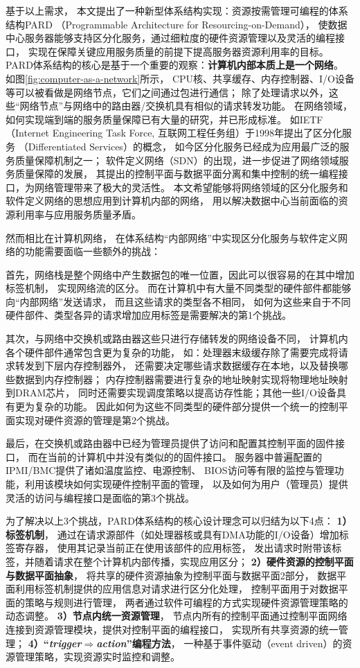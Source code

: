 基于以上需求，
本文提出了一种新型体系结构实现：资源按需管理可编程的体系结构PARD
（Programmable Architecture for Resourcing-on-Demand）\cite{pard:2015}，
使数据中心服务器能够支持区分化服务，通过细粒度的硬件资源管理以及灵活的编程接口，
实现在保障关键应用服务质量的前提下提高服务器资源利用率的目标。
PARD体系结构的核心是基于一个重要的观察：\textbf{计算机内部本质上是一个网络}。
如图\ref{fig:computer-as-a-network}所示，
CPU核、共享缓存、内存控制器、I/O设备等可以被看做是网络节点，它们之间通过包进行通信；
除了处理请求以外，这些``网络节点''与网络中的路由器/交换机具有相似的请求转发功能。
在网络领域，如何实现端到端的服务质量保障已有大量的研究，并已形成标准。
如IETF（Internet Engineering Task Force, 互联网工程任务组）于1998年提出了区分化服务
（Differentiated Services）\cite{DiffServ}的概念，
如今区分化服务已经成为应用最广泛的服务质量保障机制之一；
软件定义网络（SDN）\cite{SDN}的出现，进一步促进了网络领域服务质量保障的发展，
其提出的控制平面与数据平面分离和集中控制的统一编程接口，为网络管理带来了极大的灵活性。
本文希望能够将网络领域的区分化服务和软件定义网络的思想应用到计算机内部的网络，
用以解决数据中心当前面临的资源利用率与应用服务质量矛盾。

然而相比在计算机网络，
在体系结构``内部网络''中实现区分化服务与软件定义网络的功能需要面临一些额外的挑战：

首先，网络栈是整个网络中产生数据包的唯一位置，因此可以很容易的在其中增加标签机制，
实现网络流的区分。
而在计算机中有大量不同类型的硬件部件都能够向``内部网络''发送请求，
而且这些请求的类型各不相同，
如何为这些来自于不同硬件部件、类型各异的请求增加应用标签是需要解决的第1个挑战。

其次，与网络中交换机或路由器这些只进行存储转发的网络设备不同，
计算机内各个硬件部件通常包含更为复杂的功能，
如：处理器末级缓存除了需要完成将请求转发到下层内存控制器外，
还需要决定哪些请求数据缓存在本地，以及替换哪些数据到内存控制器；
内存控制器需要进行复杂的地址映射实现将物理地址映射到DRAM芯片，
同时还需要实现调度策略以提高访存性能；其他一些I/O设备具有更为复杂的功能。
因此如何为这些不同类型的硬件部分提供一个统一的控制平面实现对硬件资源的管理是第2个挑战。

最后，在交换机或路由器中已经为管理员提供了访问和配置其控制平面的固件接口，
而在当前的计算机中并没有类似的的固件接口。
服务器中普遍配置的IPMI/BMC\cite{ipmi}提供了诸如温度监控、电源控制、
BIOS访问等有限的监控与管理功能，利用该模块如何实现硬件控制平面的管理，
以及如何为用户（管理员）提供灵活的访问与编程接口是面临的第3个挑战。

为了解决以上3个挑战，PARD体系结构的核心设计理念可以归结为以下4点：
\textbf{1）标签机制}，
通过在请求源部件（如处理器核或具有DMA功能的I/O设备）增加标签寄存器，
使用其记录当前正在使用该部件的应用标签，
发出请求时附带该标签，并随着请求在整个计算机内部传播，实现应用区分；
\textbf{2）硬件资源的控制平面与数据平面抽象}，
将共享的硬件资源抽象为控制平面与数据平面2部分，
数据平面利用标签机制提供的应用信息对请求进行区分化处理，
控制平面用于对数据平面的策略与规则进行管理，
两者通过软件可编程的方式实现硬件资源管理策略的动态调整。
\textbf{3）节点内统一资源管理}，
节点内所有的控制平面通过控制平面网络连接到资源管理模块，提供对控制平面的编程接口，
实现所有共享资源的统一管理；
\textbf{4）``\emph{trigger$\Rightarrow$action}''编程方法}，
一种基于事件驱动（event driven）的资源管理策略，实现资源实时监控和调整。

